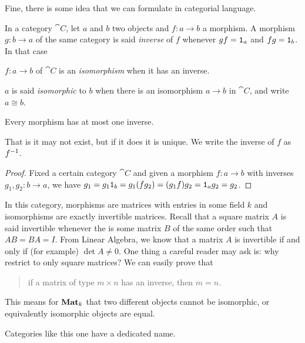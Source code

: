 Fine, there is some idea that we can formulate in categorial language.

\begin{definition}
In a category \(\cat C\), let \(a\) and \(b\) two objects and \(f : a \to b\) a morphism. A morphism \(g : b \to a\) of the same category is said {\em inverse} of \(f\) whenever \(gf = \mathtt 1_a\) and \(fg = \mathtt 1_b\). In that case
\begin{tcbitem}
\item \(f : a \to b\) of \(\cat C\) is an {\em isomorphism} when it has an inverse.
\item \(a\) is said {\em isomorphic} to \(b\) when there is an isomorphism \(a \to b\) in \(\cat C\), and write \(a \cong b\).
\end{tcbitem}
\end{definition}

\begin{lemma}
Every morphism has at most one inverse.
\end{lemma}

That is it may not exist, but if it does it is unique. We write the inverse of \(f\) as \(f^{-1}\).

\begin{proof}
Fixed a certain category \(\cat C\) and given a morphism \(f : a \to b\) with inverses \(g_1, g_2 : b \to a\), we have \(g_1 = g_1 \mathtt 1_b = g_1 (fg_2) = (g_1f)g_2 = \mathtt 1_a g_2 = g_2\).
\end{proof}

\begin{example}
In this category, morphisms are matrices with entries in some field \(k\) and isomorphisms are exactly invertible matrices. Recall that a square matrix \(A\) is said invertible whenever the is some matrix \(B\) of the same order such that \(AB = BA = I\). From Linear Algebra, we know that a matrix \(A\) is invertible if and only if (for example) \(\det A \ne 0\). One thing a careful reader may ask is: why restrict to only square matrices? We can easily prove that
\begin{quotation}
if a matrix of type \(m \times n\) has an inverse, then \(m=n\).
\end{quotation}
This means for \(\mathbf{Mat}_k\) that two different objects cannot be isomorphic, or equivalently isomorphic objects are equal.
\end{example}

Categories like this one have a dedicated name.

